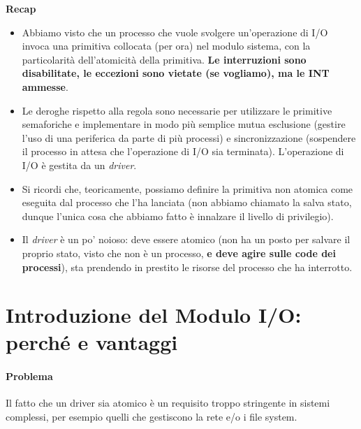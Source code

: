 \begin{framed}
	\noindent \textbf{Recap} 
	\begin{itemize}
		\item Abbiamo visto che un processo che vuole svolgere un'operazione di I/O invoca una primitiva collocata (per ora) nel modulo sistema, con la particolarità dell'atomicità della primitiva. \textbf{Le interruzioni sono disabilitate, le eccezioni sono vietate (se vogliamo), ma le INT ammesse}. 
		\item Le deroghe rispetto alla regola sono necessarie per utilizzare le primitive semaforiche e implementare in modo più semplice mutua esclusione (gestire l'uso di una periferica da parte di più processi) e sincronizzazione (sospendere il processo in attesa che l'operazione di I/O sia terminata). L'operazione di I/O è gestita da un \emph{driver}.
		\item Si ricordi che, teoricamente, possiamo definire la primitiva non atomica come eseguita dal processo che l'ha lanciata (non abbiamo chiamato la salva stato, dunque l'unica cosa che abbiamo fatto è innalzare il livello di privilegio). 
		\item 
		Il \emph{driver} è un po' noioso: deve essere atomico (non ha un posto per salvare il proprio stato, visto che non è un processo, \textbf{e deve agire sulle code dei processi}), sta prendendo in prestito le risorse del processo che ha interrotto.
	\end{itemize}
\end{framed}

\clearpage

\section{Introduzione del Modulo I/O: perché e vantaggi}
\paragraph{Problema} Il fatto che un driver sia atomico è un requisito troppo stringente in sistemi complessi, per esempio quelli che gestiscono la rete e/o i file system. 

